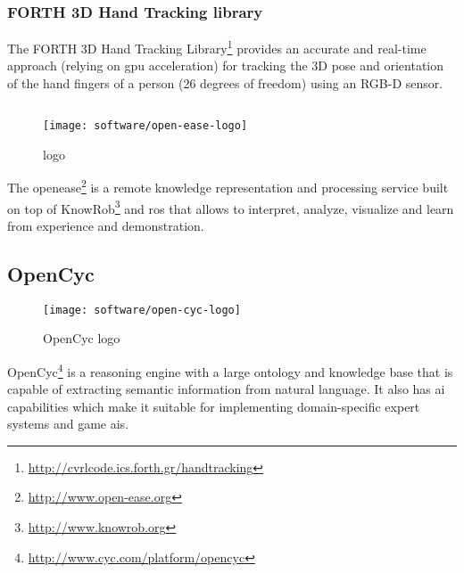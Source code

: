 \subsubsection{FORTH 3D Hand Tracking library}

The FORTH 3D Hand Tracking Library\footnote{\url{http://cvrlcode.ics.forth.gr/handtracking}} \cite{Oikonomidis2011,Kyriazis2012} provides an accurate and real-time approach (relying on \gls{gpu} acceleration) for tracking the 3D pose and orientation of the hand fingers of a person (26 degrees of freedom) using an RGB-D sensor.




\subsection{}

\begin{wrapfigure}{r}{0.23\textwidth}
	\centering
	\vspace*{-2em}
	\texttt{[image: software/open-ease-logo]}
	\caption{ logo}
	\label{fig:open-ease}
\end{wrapfigure}

The \gls{openease}\footnote{\url{http://www.open-ease.org}} \cite{Beetz2015} is a remote knowledge representation and processing service built on top of KnowRob\footnote{\url{http://www.knowrob.org}} and \gls{ros} that allows to interpret, analyze, visualize and learn from experience and demonstration.


\subsection{OpenCyc}

\begin{wrapfigure}{r}{0.23\textwidth}
	\centering
	\vspace*{-2em}
	\texttt{[image: software/open-cyc-logo]}
	\caption{OpenCyc logo}
	\label{fig:open-cyc}
\end{wrapfigure}

OpenCyc\footnote{\url{http://www.cyc.com/platform/opencyc}} is a reasoning engine with a large ontology and knowledge base that is capable of extracting semantic information from natural language. It also has \gls{ai} capabilities which make it suitable for implementing domain-specific expert systems and game \glspl{ai}.



